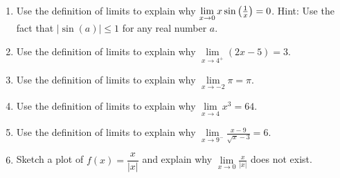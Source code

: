 \begin{exercise}
    ~\\

    \begin{enumerate} 
		\item Use the definition of limits to explain why $\lim\limits_{x\to 0 } x\sin
		\left( {1\over x}\right) = 0$.  Hint: Use the fact that $|\sin(a) |\le 1$ for any real number $a$.
		\item Use the definition of limits to explain why $\lim\limits_{x\to 4^+} (2x-5) = 3$.
		\item Use the definition of limits to explain why $\lim\limits_{x\to -2} \pi = \pi$.
		\item Use the definition of limits to explain why $\lim\limits_{x\to 4} x^3 = 64$.
		\item Use the definition of limits to explain why $\lim\limits_{x\to 9^-} \frac{x-9}{\sqrt{x}-3} = 6$.
        \item Sketch a plot of $f(x) = \dfrac{x}{|x|}$ and explain why $\lim\limits_{x\to 0} \frac{x}{|x|}$ does not exist.
    \end{enumerate}

\end{exercise}
